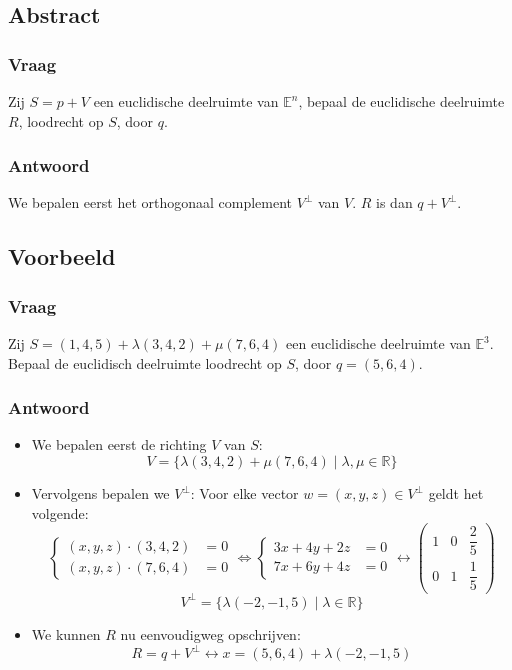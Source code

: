 \documentclass[main.tex]{subfiles}
\begin{document}
\subsection{Abstract}
\subsubsection{Vraag}
\begin{center}
  Zij $S=p+V$ een euclidische deelruimte van $\mathbb{E}^{n}$, bepaal de euclidische deelruimte $R$, loodrecht op $S$, door $q$.
\end{center}
\subsubsection{Antwoord}
We bepalen eerst het orthogonaal complement $V^{\bot}$ van $V$.
$R$ is dan $q+V^{\bot}$.

\subsection{Voorbeeld}
\subsubsection{Vraag}
\begin{center}
  Zij $S=(1,4,5) + \lambda(3,4,2) + \mu (7,6,4)$ een euclidische deelruimte van $\mathbb{E}^{3}$.
  Bepaal de euclidisch deelruimte loodrecht op $S$, door $q=(5,6,4)$.
\end{center}
\subsubsection{Antwoord}
\begin{itemize}
\item We bepalen eerst de richting $V$ van $S$:
  \[ V = \{ \lambda(3,4,2) + \mu (7,6,4) \mid \lambda,\mu \in
  \mathbb{R} \} \]
\item Vervolgens bepalen we $V^{\bot}$:
  Voor elke vector $w=(x,y,z)\in V^{\bot}$ geldt het volgende:
  \[
  \left\{
    \begin{array}{cc}
      (x,y,z) \cdot (3,4,2)&= 0\\
      (x,y,z) \cdot (7,6,4)&= 0
    \end{array}
  \right.
  \Leftrightarrow
  \left\{
    \begin{array}{cc}
      3x+4y+2z&= 0\\
      7x+6y+4z&= 0
    \end{array}
  \right.
  \longleftrightarrow
  \begin{pmatrix}
    1 & 0 & \dfrac{2}{5}\\
    0 & 1 & \dfrac{1}{5}
  \end{pmatrix}
  \]
  \[
  V^{\bot} = \{ \lambda(-2, - 1, 5) \mid \lambda \in \mathbb{R} \}
  \]
\item We kunnen $R$ nu eenvoudigweg opschrijven:
  \[ R = q+V^{\bot} \leftrightarrow x = (5,6,4) + \lambda (-2, - 1, 5) \]
\end{itemize}
\end{document}
